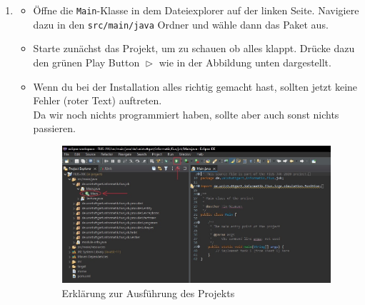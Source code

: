 \begin{enumerate}

	\item
    \begin{itemize}
        \item Öffne die \texttt{Main}-Klasse in dem Dateiexplorer auf der linken Seite. Navigiere dazu in den \texttt{src/main/java} Ordner und wähle dann das Paket \texttt{\javaPackageName} aus.
        \item Starte zunächst das Projekt, um zu schauen ob alles klappt. Drücke dazu den grünen Play Button $\vartriangleright$ wie in der Abbildung unten dargestellt.
        \item Wenn du bei der Installation alles richtig gemacht hast, sollten jetzt keine Fehler (roter Text) auftreten.\\
        Da wir noch nichts programmiert haben, sollte aber auch sonst nichts passieren.
		\begin{figure} [H]
			\centering
			\includegraphics [width=1\textwidth]{./figures/ide.jpg}
			\caption{Erklärung zur Ausführung des Projekts}
		\end{figure}
    \end{itemize}


\end{enumerate}
